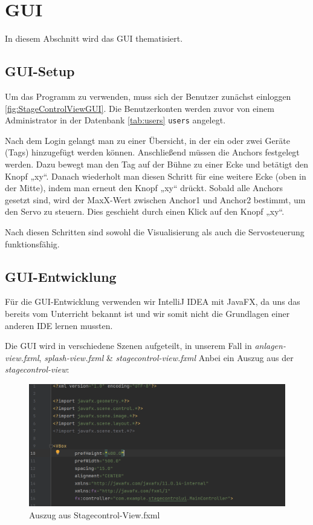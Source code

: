 \section{GUI}
In diesem Abschnitt wird das GUI thematisiert.

\subsection{GUI-Setup}
Um das Programm zu verwenden, muss sich der Benutzer zunächst einloggen \ref{fig:StageControlViewGUI}. Die Benutzerkonten werden zuvor von einem Administrator in der Datenbank \ref{tab:users} \texttt{users} angelegt.  

Nach dem Login gelangt man zu einer Übersicht, in der ein oder zwei Geräte (Tags) hinzugefügt werden können. Anschließend müssen die Anchors festgelegt werden. Dazu bewegt man den Tag auf der Bühne zu einer Ecke und betätigt den Knopf „xy“. Danach wiederholt man diesen Schritt für eine weitere Ecke (oben in der Mitte), indem man erneut den Knopf „xy“ drückt. Sobald alle Anchors gesetzt sind, wird der MaxX-Wert zwischen Anchor1 und Anchor2 bestimmt, um den Servo zu steuern. Dies geschieht durch einen Klick auf den Knopf „xy“.  

Nach diesen Schritten sind sowohl die Visualisierung als auch die Servosteuerung funktionsfähig.


\subsection{GUI-Entwicklung}
Für die GUI-Entwicklung verwenden wir IntelliJ IDEA mit JavaFX, da uns das bereits vom Unterricht bekannt ist und wir somit nicht die Grundlagen einer anderen IDE lernen mussten.

Die GUI wird in verschiedene Szenen aufgeteilt, in unserem Fall in \textit{anlagen-view.fxml}, \textit{splash-view.fxml} \& \textit{stagecontrol-view.fxml}
Anbei ein Auszug aus der \textit{stagecontrol-view}:

\begin{figure}[H]
	\centering
	\includegraphics[width=0.5\linewidth]{images/stagecontrol-view.png}
	\caption[Auszug aus Stagecontrol-View.fxml]{Auszug aus Stagecontrol-View.fxml}
	\label{fig:Stagecontrolview}
\end{figure}

